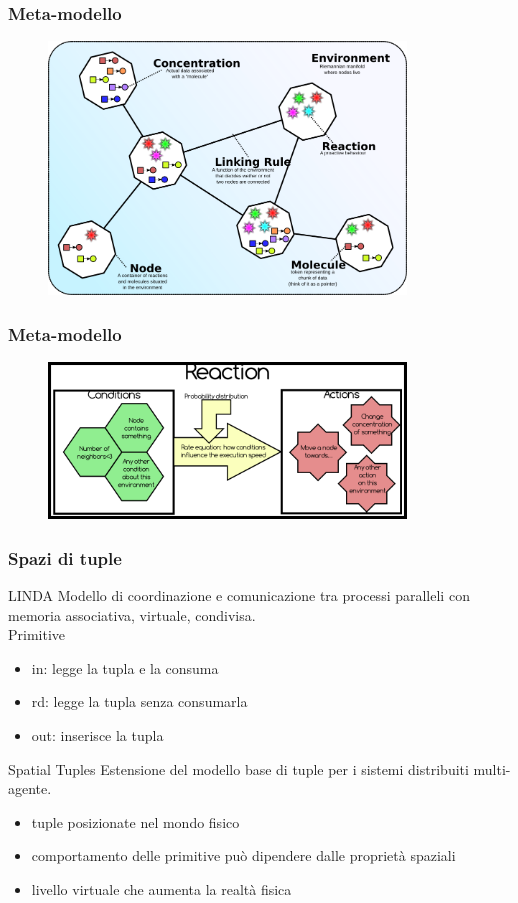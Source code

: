 \documentclass[handout]{beamer}\mode<presentation>{\usetheme{AMSCesenaBleu}}
\begin{document}
\begin{frame}
\frametitle{Meta-modello}
\begin{figure}
\includegraphics[width=9.5cm]{images/alchemistModel.png}
\end{figure}
\end{frame}

\begin{frame}
\frametitle{Meta-modello}
\begin{figure}
\includegraphics[width=9.5cm]{images/alchemistReaction.png}
\end{figure}
\end{frame}



\begin{frame}
\frametitle{Spazi di tuple}
\begin{block}{LINDA}
Modello di coordinazione e comunicazione tra processi paralleli con memoria associativa, virtuale, condivisa.
\\\vspace{0.2cm}
Primitive
\begin{itemize}
\item in: legge la tupla e la consuma
\item rd: legge la tupla senza consumarla
\item out: inserisce la tupla
\end{itemize}
\end{block}
\begin{block}{Spatial Tuples}
Estensione del modello base di tuple per i sistemi distribuiti multi-agente.
\\
\begin{itemize}
\item tuple posizionate nel mondo fisico
\item comportamento delle primitive può dipendere dalle proprietà spaziali
\item livello virtuale che aumenta la realtà fisica
\end{itemize}

\end{block}
\end{frame}
\end{document}
